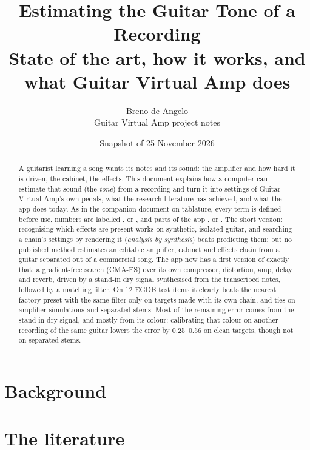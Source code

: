 \documentclass[11pt]{article}
\title{Estimating the Guitar Tone of a Recording\\[4pt]
\large State of the art, how it works, and what Guitar Virtual Amp does}
\author{Breno de Angelo\\\small Guitar Virtual Amp project notes}
\date{Snapshot of 25 November 2026}
\begin{document}
\maketitle

\begin{abstract}
\noindent
A guitarist learning a song wants its notes and its sound: the amplifier and how
hard it is driven, the cabinet, the effects. This document explains how a
computer can estimate that sound (the \emph{tone}) from a recording and turn it
into settings of Guitar Virtual Amp's own pedals, what the research literature
has achieved, and what the app does today. As in the companion document on
tablature, every term is defined before use, numbers are labelled
\measured{}, \reported{} or \expected{}, and parts of the app \done{}, \wip{} or
\planned. The short version: recognising which effects are present works on
synthetic, isolated guitar, and searching a chain's settings by rendering it
(\emph{analysis by synthesis}) beats predicting them; but no published method
estimates an editable amplifier, cabinet and effects chain from a guitar
separated out of a commercial song. The app now has a first version of exactly
that: a gradient-free search (CMA-ES) over its own compressor, distortion, amp,
delay and reverb, driven by a stand-in dry signal synthesised from the
transcribed notes, followed by a matching filter. On 12 EGDB test items it
clearly beats the nearest factory preset with the same filter only on targets
made with its own chain, and ties on amplifier simulations and separated stems.
Most of the remaining error comes from the stand-in dry signal, and mostly from
its colour: calibrating that colour on another recording of the same guitar
lowers the error by 0.25--0.56\dB{} on clean targets, though not on separated
stems.
\end{abstract}

\tableofcontents
\clearpage



\part{Background}





\part{The literature}







\end{document}
